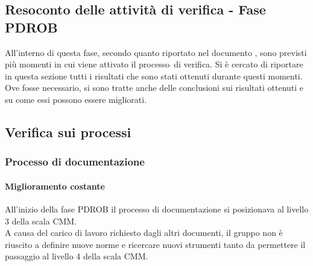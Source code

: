 \documentclass[../PianoDiQualifica.tex]{subfiles}
\begin{document}
\begin{appendices}
\section{Resoconto delle attività di verifica - Fase PDROB}
All'interno di questa fase\g, secondo quanto riportato nel documento \pianodiprogetto, sono previsti più momenti in cui viene attivato il processo\g\ di verifica. Si è cercato di riportare in questa sezione tutti i risultati che sono stati ottenuti durante questi momenti. Ove fosse necessario, si sono tratte anche delle conclusioni sui risultati ottenuti e su come essi possono essere migliorati.
	
	\subsection{Verifica sui processi}
		\subsubsection{Processo di documentazione}
			\paragraph{Miglioramento costante}
			All'inizio della fase PDROB il processo di documentazione si posizionava al livello 3 della scala CMM.\\
			A causa del carico di lavoro richiesto dagli altri documenti, il gruppo non è riuscito a definire nuove norme e ricercare nuovi strumenti tanto da permettere il passaggio al livello 4 della scala CMM.
			

\end{appendices}
\end{document}
